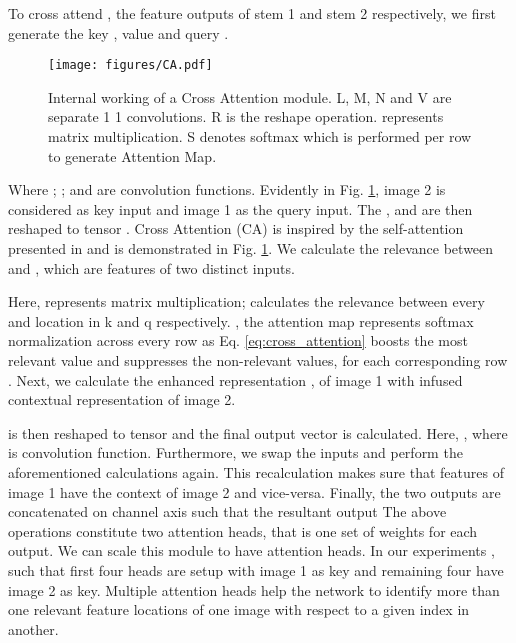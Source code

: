 \documentclass[a4paper,conference]{IEEEtran}
\begin{document}
To cross attend ,  the feature outputs of stem 1 and stem 2 respectively, we first generate the key , value  and query .
\begin{figure}[!htb]
\begin{center}
\texttt{[image: figures/CA.pdf]}
\caption{\label{fig:cross_attention} Internal working of a Cross Attention module. L, M, N and V are separate 1  1 convolutions. R is the reshape operation.  represents matrix multiplication. S denotes softmax which is performed per row to generate Attention Map.} 
\end{center}
\end{figure}Where ; ;  and  are  convolution functions. Evidently in Fig. \ref{fig:cross_attention}, image 2 is considered as key input and image 1 as the query input.
The ,  and  are then reshaped to tensor . Cross Attention (CA) is inspired by the self-attention presented in \cite{zhang_self-attention_2019} and is demonstrated in Fig. \ref{fig:cross_attention}. We calculate the relevance between  and , which are features of two distinct inputs. 


Here,  represents matrix multiplication;  calculates the relevance between every  and  location in k and q respectively. , the attention map represents softmax normalization across every  row as Eq. \ref{eq:cross_attention} boosts the most relevant  value and suppresses the non-relevant values, for  each corresponding  row .
Next, we calculate the enhanced representation , of image 1 with infused contextual representation of image 2.

 is then reshaped to tensor  and the final output vector  is calculated. Here, , where  is  convolution function.
\newline \indent Furthermore, we swap the inputs and perform the aforementioned calculations again. This recalculation makes sure that features of image 1 have the context of image 2 and vice-versa. Finally, the two outputs are concatenated on channel axis such that the resultant output 
\newline \indent The above operations constitute two attention heads, that is one set of weights for each output. We can scale this module to have  attention heads. In our experiments , such that first four heads are setup with image 1 as key and remaining four have image 2 as key. Multiple attention heads help the network to identify more than one relevant feature locations of one image with respect to a given index in another.
\end{document}

